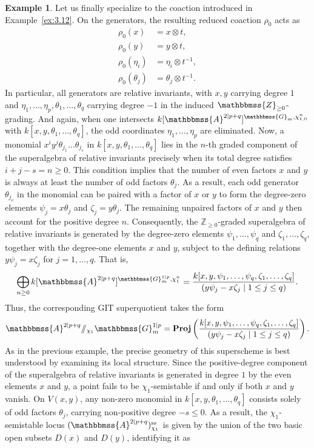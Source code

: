 \documentclass[11pt,a4paper,reqno,noamsfonts]{amsart}
\numberwithin{equation}{section}
\theoremstyle{definition}
\newtheorem{example}[theorem]{Example}
\theoremstyle{remark}
\renewcommand{\AA}{\ensuremath{\mathbbmss{A}}}
\newcommand{\GG}{\ensuremath{\mathbbmss{G}}}
\newcommand{\ZZ}{\ensuremath{\mathbbmss{Z}}}
\newcommand{\uss}{\ensuremath{\mathrm{ss}}}
\DeclareMathOperator{\sProj}{\mathbf{Proj}}
\begin{document}
\begin{example}
Let us finally specialize to the coaction introduced in Example~\ref{ex:3.12}. On the generators, the resulting reduced coaction $\rho_0$ acts as
$$
\begin{aligned} 
 \rho_0 (x) &= x \otimes t, \\ 
 \rho_0 (y) &= y \otimes t, \\  
 \rho_0 (\eta_i) &= \eta_i \otimes t^{-1}, \\ 
 \rho_0 (\theta_j) &= \theta_j \otimes t^{-1}. 
 \end{aligned}
$$
In particular, all generators are relative invariants, with $x, y$ carrying degree $1$ and $\eta_1,\dots,\eta_p, \theta_1,\dots,\theta_q$ carrying degree $-1$ in the induced $\ZZ_{\geq 0}$-grading. And again, when one intersects $k[\AA^{2\vert p+q}]^{\GG_m, \chi_{1,0}^n}$ with $k[x,y,\theta_1,\dots,\theta_q]$, the odd coordinates $\eta_1,\dots,\eta_p$ are eliminated. Now, a monomial $x^i y^j \theta_{j_1} \dots \theta_{j_s}$ in $k[x,y,\theta_1,\dots,\theta_q]$ lies in the $n$-th graded component of the superalgebra of relative invariants precisely when its total degree satisfies $i+j-s = n \geq 0$. This condition implies that the number of even factors $x$ and $y$ is always at least the number of odd factors $\theta_j$. As a result, each odd generator $\theta_{j_\nu}$ in the monomial can be paired with a factor of $x$ or $y$ to form the degree-zero elements $\psi_j = x \theta_j$ and $\zeta_j = y \theta_j$. The remaining unpaired factors of $x$ and $y$ then account for the positive degree $n$. Consequently, the $\mathbb{Z}_{\ge 0}$-graded superalgebra of relative invariants is generated by the degree-zero elements $\psi_1,\dots,\psi_q$ and $\zeta_1,\dots,\zeta_q$, together with the degree-one elements $x$ and $y$, subject to the defining relations $y \psi_j = x \zeta_j$ for $j = 1, \dots, q$. That is,
$$
\bigoplus_{n \geq 0} k[\AA^{2 \vert p+q}]^{\GG_m^{1 \vert p}, \chi_1^n} = \frac{k[x,y,\psi_1,\dots,\psi_q, \zeta_1,\dots,\zeta_q]}{(y \psi_j - x \zeta_j \mid 1 \le j \le q)}.
$$
Thus, the corresponding GIT superquotient takes the form
$$
\AA^{2 \vert p+q} {\sslash_{\chi_1}} \GG_m^{1 \vert p} = \sProj \left( \frac{k[x,y,\psi_1,\dots,\psi_q, \zeta_1,\dots,\zeta_q]}{(y \psi_j - x \zeta_j \mid 1 \le j \le q)} \right). 
$$
As in the previous example, the precise geometry of this superscheme is best understood by examining its local structure. Since the positive-degree component of the superalgebra of relative invariants is generated in degree $1$ by the even elements $x$ and $y$, a point fails to be $\chi_1$-semistable if and only if both $x$ and $y$ vanish. On $V(x,y)$, any non-zero monomial in $k[x,y,\theta_1,\dots,\theta_q]$ consists solely of odd factors $\theta_j$, carrying non-positive degree $-s \leq 0$. As a result, the $\chi_{1}$-semistable locus $(\AA^{2 \vert p+q})^{\uss}_{\chi_1}$ is given by the union of the two basic open subsets $D(x)$ and $D(y)$, identifying it as

\end{example}
\end{document}
